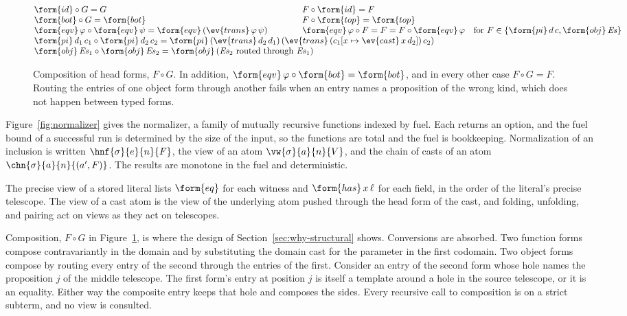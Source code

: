 \begin{figure}
\small
\[
\begin{array}{@{}lcl@{}}
\form{id} \circ G = G & \qquad & F \circ \form{id} = F \\
\form{bot} \circ G = \form{bot} & & F \circ \form{top} = \form{top} \\
\form{eqv}\,\varphi \circ \form{eqv}\,\psi = \form{eqv}\,(\ev{trans}\,\varphi\,\psi) & & \form{eqv}\,\varphi \circ F = F = F \circ \form{eqv}\,\varphi \quad \text{for } F \in \{\form{pi}\,d\,c, \form{obj}\,\mathit{Es}\} \\
\multicolumn{3}{@{}l@{}}{\form{pi}\,d_1\,c_1 \circ \form{pi}\,d_2\,c_2 = \form{pi}\,(\ev{trans}\,d_2\,d_1)\,(\ev{trans}\,(c_1[x \mapsto \ev{cast}\,x\,d_2])\,c_2)} \\
\multicolumn{3}{@{}l@{}}{\form{obj}\,\mathit{Es}_1 \circ \form{obj}\,\mathit{Es}_2 = \form{obj}\,(\mathit{Es}_2 \text{ routed through } \mathit{Es}_1)}
\end{array}
\]
\caption{Composition of head forms, $F \circ G$. In addition, $\form{eqv}\,\varphi \circ \form{bot} = \form{bot}$, and in every other case $F \circ G = F$. Routing the entries of one object form through another fails when an entry names a proposition of the wrong kind, which does not happen between typed forms.}
\label{fig:combine}
\end{figure}

Figure~\ref{fig:normalizer} gives the normalizer, a family of mutually recursive functions indexed by fuel. Each returns an option, and the fuel bound of a successful run is determined by the size of the input, so the functions are total and the fuel is bookkeeping. Normalization of an inclusion is written $\hnf{\sigma}{e}{n}{F}$, the view of an atom $\vw{\sigma}{a}{n}{V}$, and the chain of casts of an atom $\chn{\sigma}{a}{n}{(a', F)}$. The results are monotone in the fuel and deterministic.

The precise view of a stored literal lists $\form{eq}$ for each witness and $\form{has}\,x\,\ell$ for each field, in the order of the literal's precise telescope. The view of a cast atom is the view of the underlying atom pushed through the head form of the cast, and folding, unfolding, and pairing act on views as they act on telescopes.

Composition, $F \circ G$ in Figure~\ref{fig:combine}, is where the design of Section~\ref{sec:why-structural} shows. Conversions are absorbed. Two function forms compose contravariantly in the domain and by substituting the domain cast for the parameter in the first codomain. Two object forms compose by routing every entry of the second through the entries of the first. Consider an entry of the second form whose hole names the proposition $j$ of the middle telescope. The first form's entry at position $j$ is itself a template around a hole in the source telescope, or it is an equality. Either way the composite entry keeps that hole and composes the sides. Every recursive call to composition is on a strict subterm, and no view is consulted.

